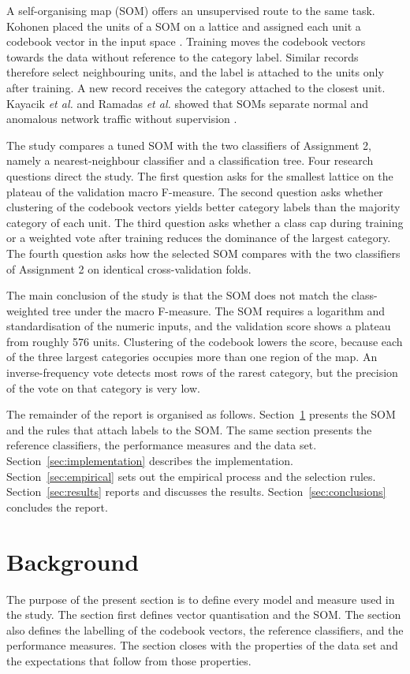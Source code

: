 \documentclass[conference,10pt]{IEEEtran}
\begin{document}
A self-organising map (SOM) offers an unsupervised route to the same task.
Kohonen placed the units of a SOM on a lattice and assigned each unit a codebook vector in the input space \cite{kohonen1990}.
Training moves the codebook vectors towards the data without reference to the category label.
Similar records therefore select neighbouring units, and the label is attached to the units only after training.
A new record receives the category attached to the closest unit.
Kayacik \emph{et al.} and Ramadas \emph{et al.} showed that SOMs separate normal and anomalous network traffic without supervision \cite{kayacik2007,ramadas2003}.

The study compares a tuned SOM with the two classifiers of Assignment 2, namely a nearest-neighbour classifier and a classification tree.
Four research questions direct the study.
The first question asks for the smallest lattice on the plateau of the validation macro F-measure.
The second question asks whether clustering of the codebook vectors yields better category labels than the majority category of each unit.
The third question asks whether a class cap during training or a weighted vote after training reduces the dominance of the largest category.
The fourth question asks how the selected SOM compares with the two classifiers of Assignment 2 on identical cross-validation folds.

The main conclusion of the study is that the SOM does not match the class-weighted tree under the macro F-measure.
The SOM requires a logarithm and standardisation of the numeric inputs, and the validation score shows a plateau from roughly 576 units.
Clustering of the codebook lowers the score, because each of the three largest categories occupies more than one region of the map.
An inverse-frequency vote detects most rows of the rarest category, but the precision of the vote on that category is very low.

The remainder of the report is organised as follows.
Section~\ref{sec:background} presents the SOM and the rules that attach labels to the SOM.
The same section presents the reference classifiers, the performance measures and the data set.
Section~\ref{sec:implementation} describes the implementation.
Section~\ref{sec:empirical} sets out the empirical process and the selection rules.
Section~\ref{sec:results} reports and discusses the results.
Section~\ref{sec:conclusions} concludes the report.

\section{Background}
\label{sec:background}
The purpose of the present section is to define every model and measure used in the study.
The section first defines vector quantisation and the SOM.
The section also defines the labelling of the codebook vectors, the reference classifiers, and the performance measures.
The section closes with the properties of the data set and the expectations that follow from those properties.
\end{document}
